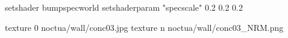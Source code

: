 setshader bumpspecworld
setshaderparam "specscale" 0.2 0.2 0.2

texture 0 noctua/wall/conc03.jpg
texture n noctua/wall/conc03_NRM.png
